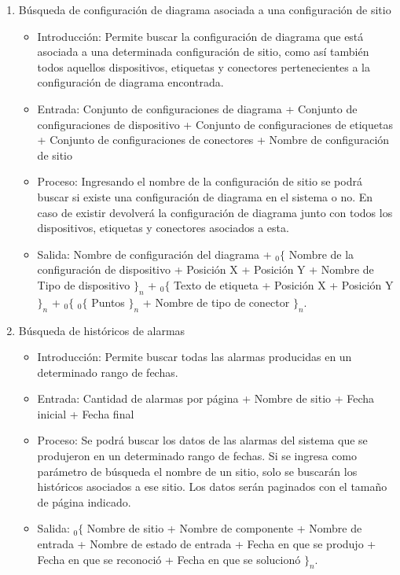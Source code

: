 \begin{enumerate}
			\item Búsqueda de configuración de diagrama asociada a una configuración de sitio
				\begin{itemize}
					\item Introducción: Permite buscar la configuración de diagrama que está asociada a una determinada configuración de sitio, como así también todos aquellos dispositivos, etiquetas y conectores pertenecientes a la configuración de diagrama encontrada.
					\item Entrada: Conjunto de configuraciones de diagrama + Conjunto de configuraciones de dispositivo + Conjunto de configuraciones de etiquetas + Conjunto de configuraciones de conectores + Nombre de configuración de sitio
					\item Proceso: Ingresando el nombre de la configuración de sitio se podrá buscar si existe una configuración de diagrama en el sistema o no. En caso de existir devolverá la configuración de diagrama junto con todos los dispositivos, etiquetas y conectores asociados a esta.
					\item Salida: Nombre de configuración del diagrama + ${}_{0}\{$ Nombre de la configuración de dispositivo + Posición X + Posición Y + Nombre de Tipo de dispositivo $\}_n$ + ${}_{0}\{$ Texto de etiqueta + Posición X + Posición Y $\}_n$ + ${}_{0}\{$ ${}_{0}\{$ Puntos $\}_n$ + Nombre de tipo de conector $\}_n$.
				\end{itemize}
				
					\item Búsqueda de históricos de alarmas
				\begin{itemize}
					\item Introducción: Permite buscar todas las alarmas producidas en un determinado rango de fechas.
					\item Entrada: Cantidad de alarmas por página + Nombre de sitio + Fecha inicial + Fecha final
					\item Proceso: Se podrá buscar los datos de las alarmas del sistema que se produjeron en un determinado rango de fechas. Si se ingresa como parámetro de búsqueda el nombre de un sitio, solo se buscarán los históricos asociados a ese sitio. Los datos serán paginados con el tamaño de página indicado.
					\item Salida: ${}_{0}\{$ Nombre de sitio + Nombre de componente + Nombre de entrada + Nombre de estado de entrada + Fecha en que se produjo + Fecha en que se reconoció + Fecha en que se solucionó $\}_n$.
				\end{itemize}
				

\end{enumerate}
